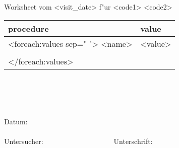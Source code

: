 \documentclass{scrreprt}
\begin{document}
\noindent Worksheet {\it <Voller Titel>} vom <visit_date> f"ur <code1> <code2> \\

\begin{tabular}{p{5cm}p{9cm}}
procedure &  value&   \tabularnewline
\hline
 <foreach:values sep=" ">
<name> &<value>\\
\tabularnewline
</foreach:values>
\hline
\end{tabular}
~
\\\\ \\\\
\noindent Datum:\\\\
\noindent Untersucher:~~~~~~~~~~~~~~~~~~~~Unterschrift:
\end{document}
